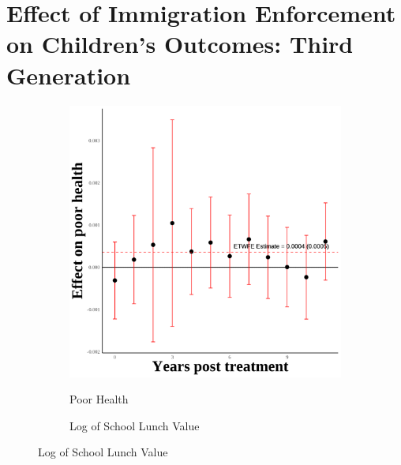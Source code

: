 \documentclass[12pt,english]{article}
\begin{document}
\pagebreak

\section{Effect of Immigration Enforcement on Children's Outcomes: Third Generation}
\begin{figure}[H]
  \caption{Effect of Immigration Enforcement on Third Generation Outcomes}
  \centering

  \begin{subfigure}[b]{0.3\textwidth}
    \centering
    \caption{Poor Health}
    \includegraphics[width=\linewidth]{figures/plot49-poor_health_event_study-third.png}
    \label{fig:poor-health-third}
  \end{subfigure}
  \hfill
  \begin{subfigure}[b]{0.3\textwidth}
    \centering
    \caption{Log of School Lunch Value}

\end{subfigure}
\end{figure}
\end{document}
